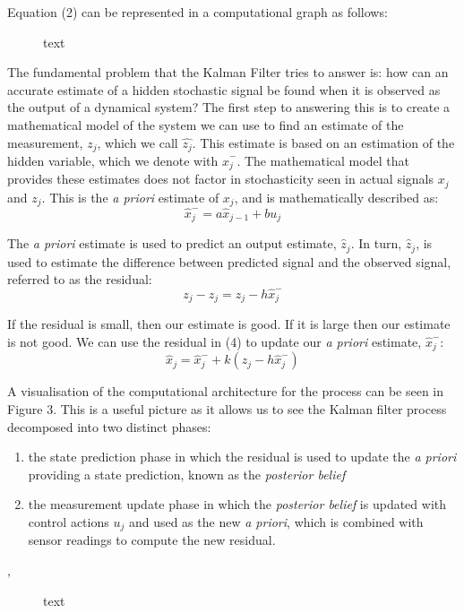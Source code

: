 \documentclass[a4paper]{article}
\begin{document}
Equation (2) can be represented in a computational graph as follows:
\begin{figure}[h]
\centering

\caption{text}
\end{figure}

The fundamental problem that the Kalman Filter tries to answer is: how can an accurate estimate of a hidden stochastic signal be found when it is observed as the output of a dynamical system? The first step to answering this is to create a mathematical model of the system we can use to find an estimate of the measurement, $z_j$, which we call $\hat{z_j}$. This estimate is based on an estimation of the hidden variable, which we denote with $\hat{x}^-_j$. The mathematical model that provides these estimates does not factor in stochasticity seen in actual signals $x_j$ and $z_j$. This is the \textit{a priori} estimate of $x_j$, and is mathematically described as:
\begin{equation}
\hat{x}^-_j = a \hat{x}_{j-1} + b u_j
\end{equation}

The \textit{a priori} estimate is used to predict an output estimate,  $\hat{z}_j$. In turn, $\hat{z}_j$, is used to estimate the difference between predicted signal and the observed signal, referred to as the residual:
\begin{equation}
z_j - \hat{z}_j = z_j - h \hat{x}^-_j
\end{equation}

If the residual is small, then our estimate is good. If it is large then our estimate is not good. We can use the residual in (4) to update our \textit{a priori} estimate, $\hat{x}^-_j$:
\begin{equation}
\hat{x}_j = \hat{x}^-_j + k (z_j - h \hat{x}^-_j)
\end{equation}

A visualisation of the computational architecture for the process can be seen in Figure 3. This is a useful picture as it allows us to see the Kalman filter process decomposed into two distinct phases:
\begin{enumerate}
\item the state prediction phase in which the residual is used to update the \textit{a priori} providing a state prediction, known as the \textit{posterior belief}
\item the measurement update phase in which the \textit{posterior belief} is updated with control actions $u_j$ and used as the new \textit{a priori}, which is combined with sensor readings to compute the new residual.
\end{enumerate}, 
\begin{figure}[h]
\centering

\caption{text}
\end{figure}
\end{document}
